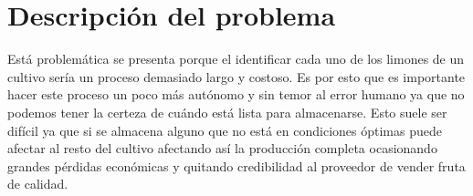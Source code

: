 \section{Descripción del problema}
Está problemática se presenta porque el identificar cada uno de los limones de un cultivo sería un proceso demasiado largo y costoso. Es por esto que es importante hacer este proceso un poco más autónomo y sin temor al error humano ya que no podemos tener la certeza de cuándo está lista para almacenarse. Esto suele ser difícil ya que si se almacena alguno que no está en condiciones óptimas puede afectar al resto del cultivo afectando así la producción completa ocasionando grandes pérdidas económicas y quitando credibilidad al proveedor de vender fruta de calidad. 